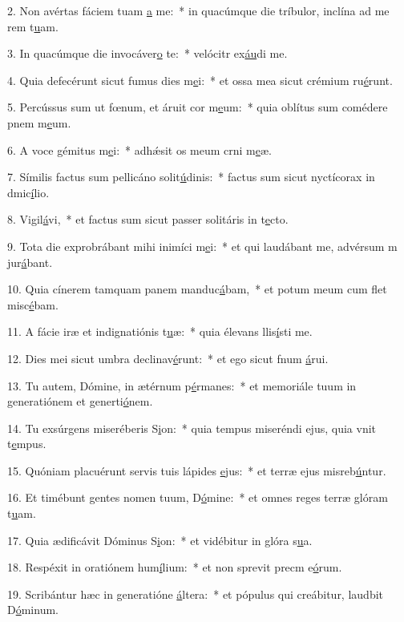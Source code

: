 2. Non avértas fáciem tuam \uline{a} me:~* in quacúmque die tríbulor, inclína ad me rem t\uline{u}am.\par 
3. In quacúmque die invocáver\uline{o} te:~* velócitr ex\uline{áu}di me.\par 
4. Quia defecérunt sicut fumus dies m\uline{e}i:~* et ossa mea sicut crémium ru\uline{é}runt.\par 
5. Percússus sum ut fœnum, et áruit cor m\uline{e}um:~* quia oblítus sum comédere pnem m\uline{e}um.\par 
6. A voce gémitus m\uline{e}i:~* adhǽsit os meum crni m\uline{e}æ.\par 
7. Símilis factus sum pellicáno solit\uline{ú}dinis:~* factus sum sicut nyctícorax in dmic\uline{í}lio.\par 
8. Vigil\uline{á}vi,~* et factus sum sicut passer solitáris in t\uline{e}cto.\par 
9. Tota die exprobrábant mihi inimíci m\uline{e}i:~* et qui laudábant me, advérsum m jur\uline{á}bant.\par 
10. Quia cínerem tamquam panem manduc\uline{á}bam,~* et potum meum cum flet misc\uline{é}bam.\par 
11. A fácie iræ et indignatiónis t\uline{u}æ:~* quia élevans llis\uline{í}sti me.\par 
12. Dies mei sicut umbra declinav\uline{é}runt:~* et ego sicut fnum \uline{á}rui.\par 
13. Tu autem, Dómine, in ætérnum p\uline{é}rmanes:~* et memoriále tuum in generatiónem et generti\uline{ó}nem.\par 
14. Tu exsúrgens miseréberis S\uline{i}on:~* quia tempus miseréndi ejus, quia vnit t\uline{e}mpus.\par 
15. Quóniam placuérunt servis tuis lápides \uline{e}jus:~* et terræ ejus misreb\uline{ú}ntur.\par 
16. Et timébunt gentes nomen tuum, D\uline{ó}mine:~* et omnes reges terræ glóram t\uline{u}am.\par 
17. Quia ædificávit Dóminus S\uline{i}on:~* et vidébitur in glóra s\uline{u}a.\par 
18. Respéxit in oratiónem hum\uline{í}lium:~* et non sprevit precm e\uline{ó}rum.\par 
19. Scribántur hæc in generatióne \uline{á}ltera:~* et pópulus qui creábitur, laudbit D\uline{ó}minum.\par 
